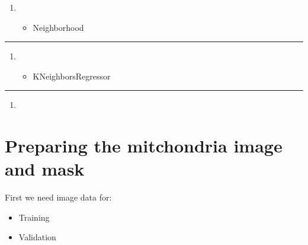 \documentclass[letterpaper,10pt,english]{sphinxmanual}
\begin{document}
\begin{enumerate}
%
\item {} 
\sphinxAtStartPar
{}
\begin{itemize}
\item {} 
\sphinxAtStartPar
Neighborhood

\end{itemize}

\end{enumerate}


\bigskip\hrule\bigskip

\begin{enumerate}
%
\item {} 
\sphinxAtStartPar
{}
\begin{itemize}
\item {} 
\sphinxAtStartPar
KNeighborsRegressor

\end{itemize}

\end{enumerate}


\bigskip\hrule\bigskip

\begin{enumerate}
%
\item {} 
\sphinxAtStartPar
{}

\end{enumerate}


\section{Preparing the mitchondria image and mask}
\label{\detokenize{05-SupervisedSegmentation:preparing-the-mitchondria-image-and-mask}}
\sphinxAtStartPar
First we need image data for:
\begin{itemize}
\item {} 
\sphinxAtStartPar
Training

\item {} 
\sphinxAtStartPar
Validation

\end{itemize}
\end{document}

